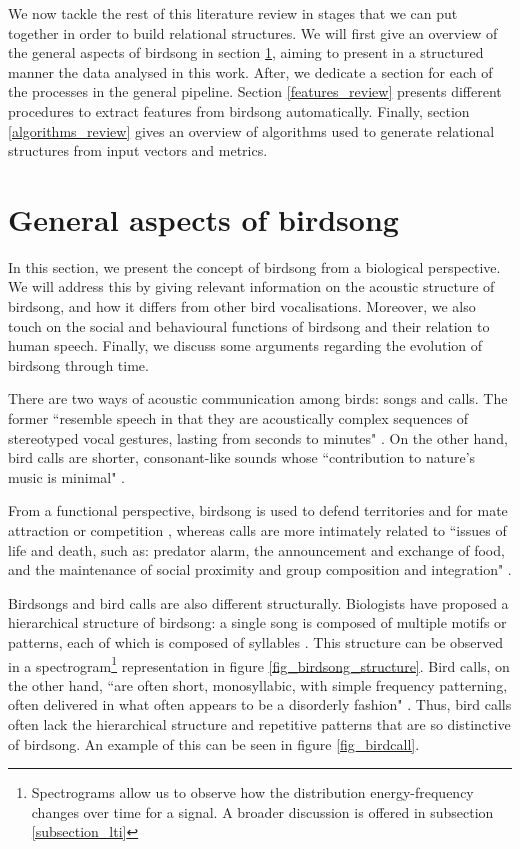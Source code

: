 \documentclass[../main.tex]{subfiles} \label{chapter_soa}
\begin{document}
\par We now tackle the rest of this literature review in stages that we can put together in order to build relational structures. We will first give an overview of the general aspects of birdsong in section \ref{birdsong_review}, aiming to present in a structured manner the data analysed in this work. After, we dedicate a section for each of the processes in the general pipeline. Section \ref{features_review} presents different procedures to extract features from birdsong automatically. Finally, section \ref{algorithms_review} gives an overview of algorithms used to generate relational structures from input vectors and metrics.

\section{General aspects of birdsong} \label{birdsong_review}
In this section, we present the concept of birdsong from a biological perspective. We will address this by giving relevant information on the acoustic structure of birdsong, and how it differs from other bird vocalisations. Moreover, we also touch on the social and behavioural functions of birdsong and their relation to human speech. Finally, we discuss some arguments regarding the evolution of birdsong through time.
\par There are two ways of acoustic communication among birds: songs and calls. The former ``resemble speech in that they are acoustically complex sequences of stereotyped vocal gestures, lasting from seconds to minutes" \cite{Snowdon2013}. On the other hand, bird calls are shorter, consonant-like sounds whose ``contribution to nature's music is minimal" \cite{Marler2004}. 
\par From a functional perspective, birdsong is used to defend territories and for mate attraction or competition \cite{Berwick2013} \cite{Naguib2014}, whereas calls are more intimately related to ``issues of life and death, such as: predator alarm, the announcement and exchange of food, and the maintenance of social proximity and group composition and integration" \cite{Marler2004}.
\par Birdsongs and bird calls are also different structurally. Biologists have proposed a hierarchical structure of birdsong: a single song is composed of multiple motifs or patterns, each of which is composed of syllables \cite{Snowdon2013}. This structure can be observed in a spectrogram\footnote{Spectrograms allow us to observe how the distribution energy-frequency changes over time for a signal. A broader discussion is offered in subsection \ref{subsection_lti}} representation in figure \ref{fig_birdsong_structure}. Bird calls, on the other hand, ``are often short, monosyllabic, with simple frequency patterning, often delivered in what often appears to be a disorderly fashion" \cite{Marler2004}. Thus, bird calls often lack the hierarchical structure and repetitive patterns that are so distinctive of birdsong. An example of this can be seen in figure \ref{fig_birdcall}.
\end{document}
